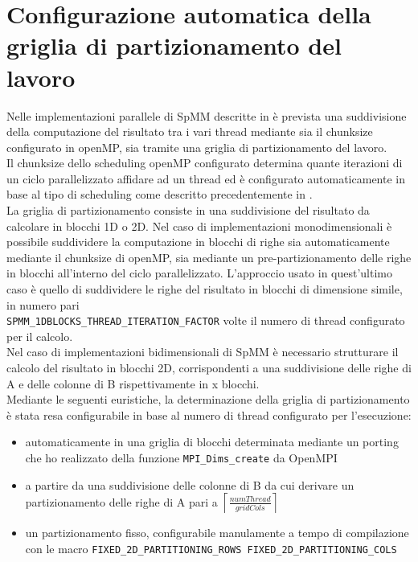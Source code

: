 \section{Configurazione automatica della griglia di partizionamento del lavoro}	\label{chSpMMAux:ompGrid}
Nelle implementazioni parallele di SpMM descritte in  è prevista una suddivisione della computazione del risultato
tra i vari thread mediante sia il chunksize configurato in openMP, sia tramite una griglia di partizionamento del lavoro.\\
Il chunksize dello scheduling openMP configurato determina quante iterazioni di un ciclo parallelizzato affidare ad un thread
ed è configurato automaticamente in base al tipo di scheduling come descritto precedentemente in .\\
La griglia di partizionamento consiste in una suddivisione del risultato da calcolare in blocchi 1D o 2D.
\voidLine
Nel caso di implementazioni monodimensionali è possibile suddividere la computazione in blocchi di righe sia automaticamente 
mediante il chunksize di openMP, sia mediante un pre-partizionamento delle righe in blocchi all'interno del ciclo parallelizzato.
L'approccio usato in quest'ultimo caso è quello di suddividere le righe del risultato in blocchi di dimensione simile,
in numero pari \\ \verb|SPMM_1DBLOCKS_THREAD_ITERATION_FACTOR| volte il numero di thread configurato per il calcolo.\\
\voidLine
Nel caso di implementazioni bidimensionali di SpMM è necessario strutturare il calcolo del risultato in blocchi 2D, corrispondenti
a una suddivisione delle righe di A e delle colonne di B rispettivamente in x blocchi.\\
Mediante le seguenti euristiche, la determinazione della griglia di partizionamento è stata resa configurabile 
in base al numero di thread configurato per l'esecuzione:\\
\begin{itemize}
	\item	automaticamente in una griglia di blocchi determinata mediante un porting che ho realizzato 
			della funzione \verb|MPI_Dims_create| da OpenMPI
	\item	a partire da una suddivisione delle colonne di B 
			da cui derivare un partizionamento delle righe di A pari a $\left\lceil \frac{numThread}{gridCols}  \right\rceil$
	\item	un partizionamento fisso, configurabile manulamente a tempo di compilazione con le macro
			\verb|FIXED_2D_PARTITIONING_ROWS FIXED_2D_PARTITIONING_COLS|
\end{itemize}
